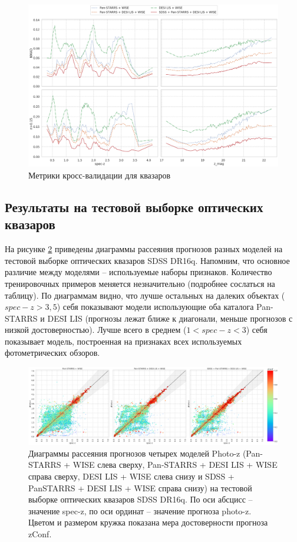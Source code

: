 \documentclass[fleqn,usenatbib]{mnras}
\begin{document}
\begin{figure}
    \centering
    \includegraphics[width=0.9\linewidth]{images/metrics-cv2-qso.png}
    \caption{Метрики кросс-валидации для квазаров}
    \label{fig:metrics-cv2-qso}
\end{figure}

\subsection{Результаты на тестовой выборке оптических квазаров}

На рисунке \ref{fig:dr16q_wo_train} приведены диаграммы рассеяния прогнозов разных моделей на тестовой выборке оптических квазаров SDSS DR16q. Напомним, что основное различие между моделями -- используемые наборы признаков. Количество тренировочных примеров меняется незначительно (подробнее сослаться на таблицу). По диаграммам видно, что  лучше остальных на далеких объектах ($spec-z > 3,5$) себя показывают модели использующие оба каталога Pan-STARRS и DESI LIS (прогнозы лежат ближе к диагонали, меньше прогнозов с низкой достоверностью). Лучше всего в среднем ($1 < spec-z < 3$) себя показывает модель, построенная на признаках всех используемых фотометрических обзоров.

\begin{figure}
    \centering
    \includegraphics[width=0.9\linewidth]{images/scatterplots-dr16q-wo-train.png}
    \caption{Диаграммы рассеяния прогнозов четырех моделей Photo-z (Pan-STARRS + WISE слева сверху, Pan-STARRS + DESI LIS + WISE справа сверху, DESI LIS + WISE слева снизу и SDSS + PanSTARRS + DESI LIS + WISE справа снизу) на тестовой выборке оптических квазаров SDSS DR16q. По оси абсцисс -- значение spec-z, по оси ординат -- значение прогноза photo-z. Цветом и размером кружка показана мера достоверности прогноза zConf.}
    \label{fig:dr16q_wo_train}
\end{figure}
\end{document}
